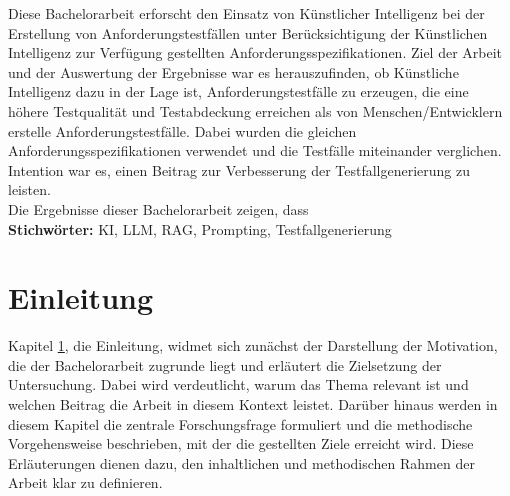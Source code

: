 \documentclass[12pt,toc=bib,toc=listof]{scrreprt}
\begin{document}
\label{sec:zusammenfassung}
Diese Bachelorarbeit erforscht den Einsatz von Künstlicher Intelligenz bei der Erstellung von Anforderungstestfällen unter Berücksichtigung der Künstlichen Intelligenz zur Verfügung gestellten Anforderungsspezifikationen. Ziel der Arbeit und der Auswertung der Ergebnisse war es herauszufinden, ob Künstliche Intelligenz dazu in der Lage ist, Anforderungstestfälle zu erzeugen, die eine höhere Testqualität und Testabdeckung erreichen als von Menschen/Entwicklern erstelle Anforderungstestfälle. Dabei wurden die gleichen Anforderungsspezifikationen verwendet und die Testfälle miteinander verglichen. Intention war es, einen Beitrag zur Verbesserung der Testfallgenerierung zu leisten.\\
Die Ergebnisse dieser Bachelorarbeit zeigen, dass
\\
\textbf{Stichwörter:} KI, LLM, RAG, Prompting, Testfallgenerierung

\newpage
{}

\chapter{Einleitung} %
\label{sec:einleitung}
Kapitel \ref{sec:einleitung}, die Einleitung, widmet sich zunächst der Darstellung der Motivation, die der Bachelorarbeit zugrunde liegt und erläutert die Zielsetzung der Untersuchung. Dabei wird verdeutlicht, warum das Thema relevant ist und welchen Beitrag die Arbeit in diesem Kontext leistet. Darüber hinaus werden in diesem Kapitel die zentrale Forschungsfrage formuliert und die methodische Vorgehensweise beschrieben, mit der die gestellten Ziele erreicht wird. Diese Erläuterungen dienen dazu, den inhaltlichen und methodischen Rahmen der Arbeit klar zu definieren.
\end{document}
